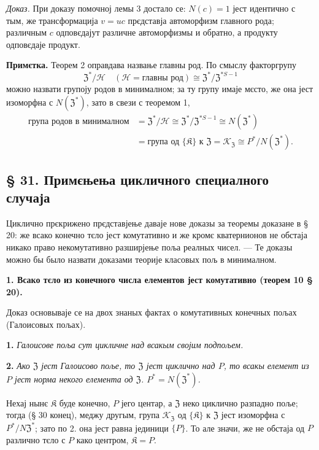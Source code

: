\documentclass[11pt]{article}
\begin{document}
\noindent\emph{Доказ.} При доказу помочној лемы 3 достало се: \(N(c)=1\) јест идентично с тым, же трансформација \(v=uc\) прєдставја автоморфизм главного рода; различным \(c\) одповєдајут различне автоморфизмы и обратно, а продукту одповєдаје продукт.

\noindent\textbf{Примєтка.} Теорем 2 оправдава назвање главны род. По смыслу факторгрупу
\[
\mathfrak Z^*/\mathscr H
\quad(\mathscr H=\text{главны род})
\cong\mathfrak Z^*/\mathfrak Z^{*S-1}
\]
можно назвати групоју родов в минималном; за ту групу имаје мєсто, же она јест изоморфна с \(N(\mathfrak Z^*)\), зато в свези с теоремом 1,
\[
\begin{aligned}
\text{група родов в минималном}
&=\mathfrak Z^*/\mathscr H
 \cong\mathfrak Z^*/\mathfrak Z^{*S-1}
 \cong N(\mathfrak Z^*)\\
&=\text{група од }\{\mathfrak K\}\text{ к }\mathfrak Z
 =\mathscr K_{\mathfrak Z}
 \cong P^*/N(\mathfrak Z^*).
\end{aligned}
\]

\subsection*{§ 31. Примєњења цикличного специалного случаја}\label{anwendungen-des-zyklischen-spezialfalles}

Циклично прєкрижено прєдставјење даваје нове доказы за теоремы доказане в § 20: же всако конечно тєло јест комутативно и же кромє кватернионов не обстаја никако право некомутативно разширјење поља реалных чисел. --- Те доказы можно бы было назвати доказами теорије класовых пољ в минималном.

\noindent\textbf{1. Всако тєло из конечного числа елементов јест комутативно (теорем 10 § 20).}

Доказ основываје се на двох знаных фактах о комутативных конечных пољах (Галоисовых пољах).

\noindent\textbf{1.} \emph{Галоисове поља сут цикличне над всакым својим подпољем.}

\noindent\textbf{2.} \emph{Ако \(\mathfrak Z\) јест Галоисово поље, то \(\mathfrak Z\) јест циклично над \(P\), то всакы елемент из \(P\) јест норма некого елемента од \(\mathfrak Z\). \(P^*=N(\mathfrak Z^*)\).}

Нехај нынє \(\mathfrak K\) буде конечно, \(P\) јего центар, а \(\mathfrak Z\) неко циклично разпадно поље; тогда (§ 30 конец), меджу другым, група \(\mathscr K_{\mathfrak Z}\) од \(\{\mathfrak K\}\) к \(\mathfrak Z\) јест изоморфна с \(P^*/N\mathfrak Z^*\); зато по 2. она јест равна јединици \(\{P\}\). То але значи, же не обстаја од \(P\) различно тєло с \(P\) како центром, \(\mathfrak K=P\).
\end{document}
